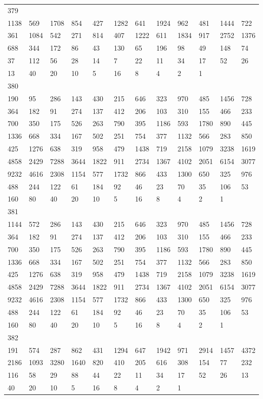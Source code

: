 \begin{longtable}{llllllllllll}
379&&&&&&&&&&&\\
1138& 569& 1708& 854& 427& 1282& 641& 1924& 962& 481& 1444& 722\\
361& 1084& 542& 271& 814& 407& 1222& 611& 1834& 917& 2752& 1376\\
688& 344& 172& 86& 43& 130& 65& 196& 98& 49& 148& 74\\
37& 112& 56& 28& 14& 7& 22& 11& 34& 17& 52& 26\\
13& 40& 20& 10& 5& 16& 8& 4& 2& 1& \\

380&&&&&&&&&&&\\
190& 95& 286& 143& 430& 215& 646& 323& 970& 485& 1456& 728\\
364& 182& 91& 274& 137& 412& 206& 103& 310& 155& 466& 233\\
700& 350& 175& 526& 263& 790& 395& 1186& 593& 1780& 890& 445\\
1336& 668& 334& 167& 502& 251& 754& 377& 1132& 566& 283& 850\\
425& 1276& 638& 319& 958& 479& 1438& 719& 2158& 1079& 3238& 1619\\
4858& 2429& 7288& 3644& 1822& 911& 2734& 1367& 4102& 2051& 6154& 3077\\
9232& 4616& 2308& 1154& 577& 1732& 866& 433& 1300& 650& 325& 976\\
488& 244& 122& 61& 184& 92& 46& 23& 70& 35& 106& 53\\
160& 80& 40& 20& 10& 5& 16& 8& 4& 2& 1& \\

381&&&&&&&&&&&\\
1144& 572& 286& 143& 430& 215& 646& 323& 970& 485& 1456& 728\\
364& 182& 91& 274& 137& 412& 206& 103& 310& 155& 466& 233\\
700& 350& 175& 526& 263& 790& 395& 1186& 593& 1780& 890& 445\\
1336& 668& 334& 167& 502& 251& 754& 377& 1132& 566& 283& 850\\
425& 1276& 638& 319& 958& 479& 1438& 719& 2158& 1079& 3238& 1619\\
4858& 2429& 7288& 3644& 1822& 911& 2734& 1367& 4102& 2051& 6154& 3077\\
9232& 4616& 2308& 1154& 577& 1732& 866& 433& 1300& 650& 325& 976\\
488& 244& 122& 61& 184& 92& 46& 23& 70& 35& 106& 53\\
160& 80& 40& 20& 10& 5& 16& 8& 4& 2& 1& \\

382&&&&&&&&&&&\\
191& 574& 287& 862& 431& 1294& 647& 1942& 971& 2914& 1457& 4372\\
2186& 1093& 3280& 1640& 820& 410& 205& 616& 308& 154& 77& 232\\
116& 58& 29& 88& 44& 22& 11& 34& 17& 52& 26& 13\\
40& 20& 10& 5& 16& 8& 4& 2& 1& \\


\end{longtable}
